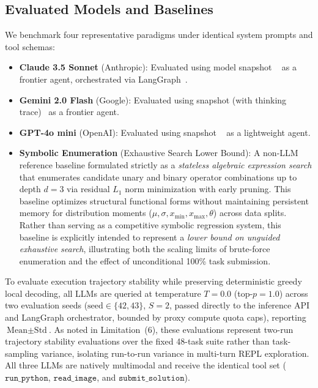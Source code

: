 \documentclass[sigconf]{acmart}
\begin{document}
\subsection{Evaluated Models and Baselines}
We benchmark four representative paradigms under identical system prompts and tool schemas:
\begin{itemize}
    \item \textbf{Claude 3.5 Sonnet} (Anthropic): Evaluated using model snapshot ~\cite{anthropic2024claude35} as a frontier agent, orchestrated via LangGraph~\cite{langgraph2024}.
    \item \textbf{Gemini 2.0 Flash} (Google): Evaluated using snapshot  (with thinking trace)~\cite{geminiteam2025gemini} as a frontier agent.
    \item \textbf{GPT-4o mini} (OpenAI): Evaluated using snapshot ~\cite{openai2024gpt4o} as a lightweight agent.
    \item \textbf{Symbolic Enumeration} (Exhaustive Search Lower Bound): A non-LLM reference baseline formulated strictly as a \emph{stateless algebraic expression search} that enumerates candidate unary and binary operator combinations up to depth $d=3$ via residual $L_1$ norm minimization with early pruning. This baseline optimizes structural functional forms without maintaining persistent memory for distribution moments ($\mu, \sigma, x_{\min}, x_{\max}, \theta$) across data splits. Rather than serving as a competitive symbolic regression system, this baseline is explicitly intended to represent a \emph{lower bound on unguided exhaustive search}, illustrating both the scaling limits of brute-force enumeration and the effect of unconditional 100\% task submission.
\end{itemize}
To evaluate execution trajectory stability while preserving deterministic greedy local decoding, all LLMs are queried at temperature $T = 0.0$ (top-$p = 1.0$) across two evaluation seeds ($\text{seed} \in \{42, 43\}$, $S=2$, passed directly to the inference API and LangGraph orchestrator, bounded by proxy compute quota caps), reporting $\text{Mean} \pm \text{Std}$. As noted in Limitation~(6), these evaluations represent two-run trajectory stability evaluations over the fixed 48-task suite rather than task-sampling variance, isolating run-to-run variance in multi-turn REPL exploration. All three LLMs are natively multimodal and receive the identical tool set ($\texttt{run\_python}$, $\texttt{read\_image}$, and $\texttt{submit\_solution}$).
\end{document}
